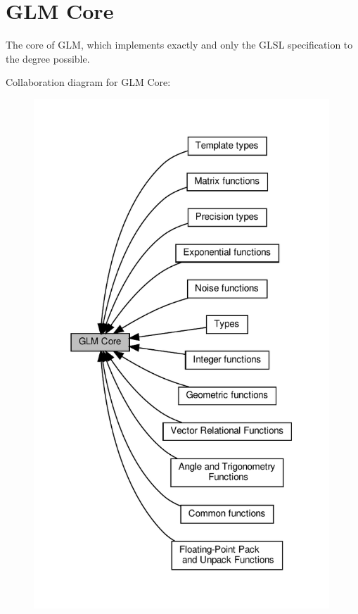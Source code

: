 \hypertarget{group__core}{}\section{G\+LM Core}
\label{group__core}


The core of G\+LM, which implements exactly and only the G\+L\+SL specification to the degree possible.  


Collaboration diagram for G\+LM Core\+:\nopagebreak
\begin{figure}[H]
\begin{center}
\leavevmode
\includegraphics[width=315pt]{group__core}
\end{center}
\end{figure}
